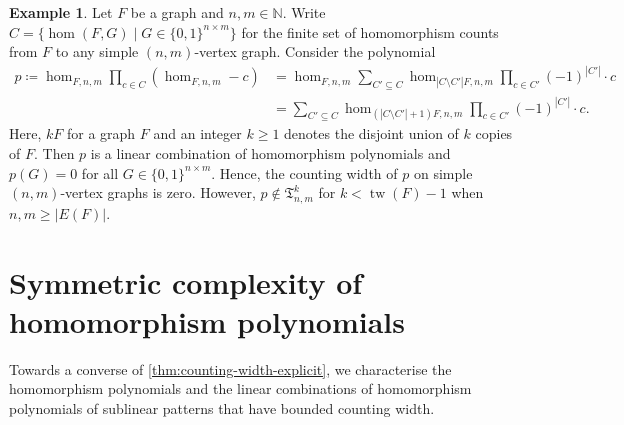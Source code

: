 \documentclass[10pt,a4paper]{article}
\theoremstyle{definition}
\newtheorem{example}[definition]{Example}
\theoremstyle{plain}
\theoremstyle{remark}
\DeclareMathOperator{\tw}{tw}
\begin{document}
	\begin{example}\label{ex:simple-interpolation}
		Let $F$ be a graph and $n,m\in \mathbb{N}$.
		Write $C = \{\hom(F, G) \mid G \in \{0,1\}^{n \times m}\}$ for the finite set of homomorphism counts from $F$ to any simple $(n,m)$-vertex graph.
		Consider the polynomial
		\begin{align*}
		p \coloneqq \hom_{F, n,m} \prod_{c \in C} (\hom_{F, n,m} - c)
		&= \hom_{F, n,m} \sum_{C' \subseteq C} \hom_{|C \setminus C'| F, n,m} \prod_{c \in C'} (-1)^{|C'|} \cdot c\\
		&=   \sum_{C' \subseteq C} \hom_{(|C \setminus C'|+1) F, n,m} \prod_{c \in C'} (-1)^{|C'|} \cdot c.
		\end{align*}
		Here, $kF$ for a graph $F$ and an integer $k \geq 1$ denotes the disjoint union of $k$ copies of $F$.
		Then $p$ is a linear combination of homomorphism polynomials and $p(G) = 0$ for all $G \in \{0,1\}^{n \times m}$.
		Hence, the counting width of $p$ on simple $(n,m)$-vertex graphs is zero.
		However, $p \not\in \mathfrak{T}^{k}_{n,m}$ for $k < \tw(F) - 1$ when $n,m \geq |E(F)|$.
	\end{example}
	
	

	
	\section{Symmetric complexity of homomorphism polynomials}
	
	Towards a converse of \cref{thm:counting-width-explicit},
	we characterise the homomorphism polynomials and the linear combinations of homomorphism polynomials of sublinear patterns that have bounded counting width.
	
\end{document}
